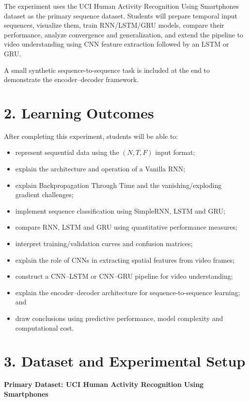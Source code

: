 \documentclass[10pt]{article}
\begin{document}
The experiment uses the UCI Human Activity Recognition Using Smartphones
dataset as the primary sequence dataset. Students will prepare temporal input
sequences, visualize them, train RNN/LSTM/GRU models, compare their
performance, analyze convergence and generalization, and extend the pipeline
to video understanding using CNN feature extraction followed by an LSTM or
GRU.

A small synthetic sequence-to-sequence task is included at the end to
demonstrate the encoder--decoder framework.

\section*{2. Learning Outcomes}

After completing this experiment, students will be able to:

\begin{itemize}
\item represent sequential data using the $(N,T,F)$ input format;
\item explain the architecture and operation of a Vanilla RNN;
\item explain Backpropagation Through Time and the vanishing/exploding gradient challenges;
\item implement sequence classification using SimpleRNN, LSTM and GRU;
\item compare RNN, LSTM and GRU using quantitative performance measures;
\item interpret training/validation curves and confusion matrices;
\item explain the role of CNNs in extracting spatial features from video frames;
\item construct a CNN--LSTM or CNN--GRU pipeline for video understanding;
\item explain the encoder--decoder architecture for sequence-to-sequence learning; and
\item draw conclusions using predictive performance, model complexity and computational cost.
\end{itemize}

\section*{3. Dataset and Experimental Setup}

\textbf{Primary Dataset: UCI Human Activity Recognition Using Smartphones}
\end{document}
